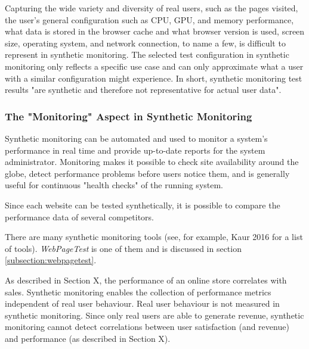 Capturing the wide variety and diversity of real users, such as the pages visited, the user's general configuration such as CPU, GPU, and memory performance, what data is stored in the browser cache and what browser version is used, screen size, operating system, and network connection, to name a few, is difficult to represent in synthetic monitoring. %
The selected test configuration in synthetic monitoring only reflects a specific use case and can only approximate what a user with a similar configuration might experience. %
In short, synthetic monitoring test results "are synthetic and therefore not representative for actual user data".  %


\subsubsection{The "Monitoring" Aspect in Synthetic Monitoring} %

Synthetic monitoring can be automated and used to monitor a system's performance in real time and provide up-to-date reports for the system administrator. %
Monitoring makes it possible to check site availability around the globe, %
detect performance problems before users notice them, %
and is generally useful for continuous "health checks" of the running system.  %

Since each website can be tested synthetically, it is possible to compare the performance data of several competitors. %



There are many synthetic monitoring tools (see, for example, Kaur 2016 for a list of tools). %
\textit{WebPageTest} is one of them and is discussed in section \ref{subsection:webpagetest}.



As described in Section X, the performance of an online store correlates with sales.
Synthetic monitoring enables the collection of performance metrics independent of real user behaviour.
Real user behaviour is not measured in synthetic monitoring.
Since only real users are able to generate revenue, synthetic monitoring cannot detect correlations between user satisfaction (and revenue) and performance (as described in Section X).%

